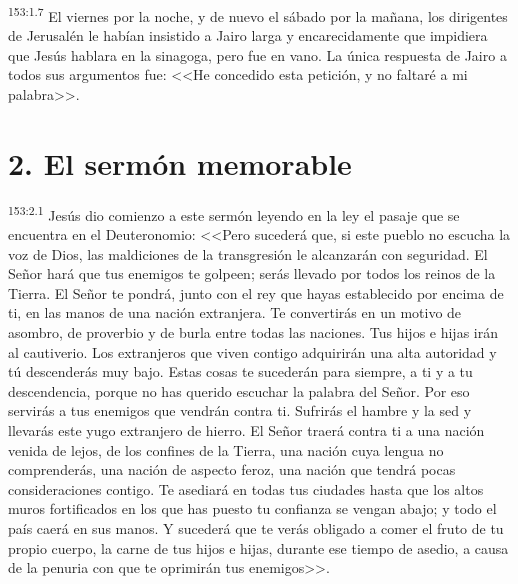 \par 
\textsuperscript{153:1.7} El viernes por la noche, y de nuevo el sábado por la mañana, los dirigentes de Jerusalén le habían insistido a Jairo larga y encarecidamente que impidiera que Jesús hablara en la sinagoga, pero fue en vano. La única respuesta de Jairo a todos sus argumentos fue: <<He concedido esta petición, y no faltaré a mi palabra>>.

\section*{2. El sermón memorable}
\par 
\textsuperscript{153:2.1} Jesús dio comienzo a este sermón leyendo en la ley el pasaje que se encuentra en el Deuteronomio: <<Pero sucederá que, si este pueblo no escucha la voz de Dios, las maldiciones de la transgresión le alcanzarán con seguridad. El Señor hará que tus enemigos te golpeen; serás llevado por todos los reinos de la Tierra. El Señor te pondrá, junto con el rey que hayas establecido por encima de ti, en las manos de una nación extranjera. Te convertirás en un motivo de asombro, de proverbio y de burla entre todas las naciones. Tus hijos e hijas irán al cautiverio. Los extranjeros que viven contigo adquirirán una alta autoridad y tú descenderás muy bajo. Estas cosas te sucederán para siempre, a ti y a tu descendencia, porque no has querido escuchar la palabra del Señor. Por eso servirás a tus enemigos que vendrán contra ti. Sufrirás el hambre y la sed y llevarás este yugo extranjero de hierro. El Señor traerá contra ti a una nación venida de lejos, de los confines de la Tierra, una nación cuya lengua no comprenderás, una nación de aspecto feroz, una nación que tendrá pocas consideraciones contigo. Te asediará en todas tus ciudades hasta que los altos muros fortificados en los que has puesto tu confianza se vengan abajo; y todo el país caerá en sus manos. Y sucederá que te verás obligado a comer el fruto de tu propio cuerpo, la carne de tus hijos e hijas, durante ese tiempo de asedio, a causa de la penuria con que te oprimirán tus enemigos>>.

